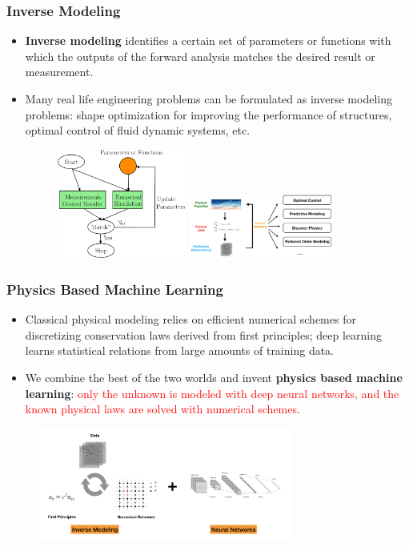 \documentclass{beamer}
\begin{document}
\begin{frame}
	\frametitle{Inverse Modeling}
	\begin{itemize}
		\item \textbf{Inverse modeling} identifies a certain set of parameters or functions with which the outputs of the forward analysis matches the desired result or measurement.
		\item Many real life engineering problems can be formulated as inverse modeling problems: shape optimization for improving the performance of structures, optimal control of fluid dynamic systems, etc.
		\begin{figure}[hbt]
  \includegraphics[width=0.4\textwidth]{../im.png}
  \includegraphics[width=0.45\textwidth]{../inverse2}
\end{figure}

	\end{itemize}
\end{frame}

\begin{frame}
	\frametitle{Physics Based Machine Learning}
	\begin{itemize}
		\item Classical physical modeling relies on efficient numerical schemes for discretizing conservation laws derived from first principles; deep learning learns statistical relations from large amounts of training data.
		\item We combine the best of the two worlds and invent \textbf{physics based machine learning}: \textcolor{red}{only the unknown is modeled with deep neural networks, and the known physical laws are solved with numerical schemes}.
	\end{itemize}
	\begin{figure}[hbt]
  \includegraphics[width=0.75\textwidth]{../physics_based_machine_learning.png}
\end{figure}
\end{frame}
\end{document}
